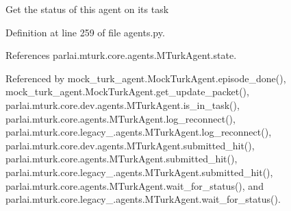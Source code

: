 \begin{DoxyVerb}Get the status of this agent on its task\end{DoxyVerb}
 

Definition at line 259 of file agents.\+py.



References parlai.\+mturk.\+core.\+agents.\+M\+Turk\+Agent.\+state.



Referenced by mock\+\_\+turk\+\_\+agent.\+Mock\+Turk\+Agent.\+episode\+\_\+done(), mock\+\_\+turk\+\_\+agent.\+Mock\+Turk\+Agent.\+get\+\_\+update\+\_\+packet(), parlai.\+mturk.\+core.\+dev.\+agents.\+M\+Turk\+Agent.\+is\+\_\+in\+\_\+task(), parlai.\+mturk.\+core.\+agents.\+M\+Turk\+Agent.\+log\+\_\+reconnect(), parlai.\+mturk.\+core.\+legacy\+\_.\+agents.\+M\+Turk\+Agent.\+log\+\_\+reconnect(), parlai.\+mturk.\+core.\+dev.\+agents.\+M\+Turk\+Agent.\+submitted\+\_\+hit(), parlai.\+mturk.\+core.\+agents.\+M\+Turk\+Agent.\+submitted\+\_\+hit(), parlai.\+mturk.\+core.\+legacy\+\_.\+agents.\+M\+Turk\+Agent.\+submitted\+\_\+hit(), parlai.\+mturk.\+core.\+agents.\+M\+Turk\+Agent.\+wait\+\_\+for\+\_\+status(), and parlai.\+mturk.\+core.\+legacy\+\_.\+agents.\+M\+Turk\+Agent.\+wait\+\_\+for\+\_\+status().

